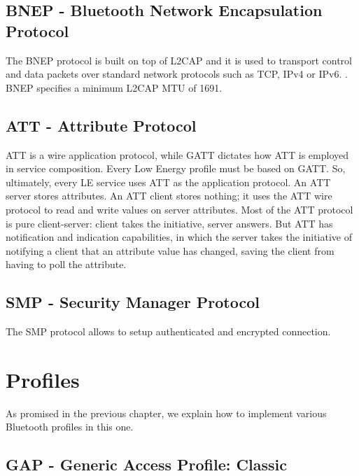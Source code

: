 \subsection{BNEP -  Bluetooth Network Encapsulation Protocol}
The BNEP protocol is built on top of L2CAP and it is used to transport control and data packets over standard network protocols such as TCP, IPv4 or IPv6.  . BNEP specifies a minimum L2CAP MTU of 1691. 


\subsection{ATT - Attribute Protocol}
ATT is a wire application protocol, while GATT dictates how ATT is employed in service composition. Every Low Energy profile must be based on GATT. So, ultimately, every LE service uses ATT as the application protocol. An ATT server stores attributes. An ATT client stores nothing; it uses the ATT wire protocol to read and write values on server attributes. Most of the ATT protocol is pure client-server: client takes the initiative, server answers. But ATT has notification and indication capabilities, in which the server takes the initiative of notifying a client that an attribute value has changed, saving the client from having to poll the attribute.


\subsection{SMP - Security Manager Protocol }
The SMP protocol allows to setup authenticated and encrypted connection.




\section{Profiles}
As promised in the previous chapter, we explain how to implement various Bluetooth profiles in this one.


\subsection{GAP - Generic Access Profile: Classic}

